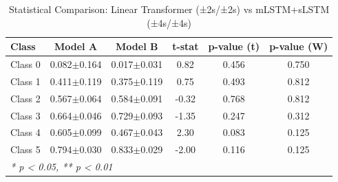 \begin{table}[htbp]
\centering
\caption{Statistical Comparison: Linear Transformer (±2s/±2s) vs mLSTM+sLSTM (±4s/±4s)}
\label{tab:comparison_class_linear_transformer_±2s_±2s_vs_mlstmslstm_±4s_±4s}
\begin{tabular}{lccccc}
\toprule
\textbf{Class} & \textbf{Model A} & \textbf{Model B} & \textbf{t-stat} & \textbf{p-value (t)} & \textbf{p-value (W)} \\
\midrule
Class 0 & 0.082$\pm$0.164 & 0.017$\pm$0.031 & 0.82 & 0.456 & 0.750 \\
Class 1 & 0.411$\pm$0.119 & 0.375$\pm$0.119 & 0.75 & 0.493 & 0.812 \\
Class 2 & 0.567$\pm$0.064 & 0.584$\pm$0.091 & -0.32 & 0.768 & 0.812 \\
Class 3 & 0.664$\pm$0.046 & 0.729$\pm$0.093 & -1.35 & 0.247 & 0.312 \\
Class 4 & 0.605$\pm$0.099 & 0.467$\pm$0.043 & 2.30 & 0.083 & 0.125 \\
Class 5 & 0.794$\pm$0.030 & 0.833$\pm$0.029 & -2.00 & 0.116 & 0.125 \\
\bottomrule
\multicolumn{6}{l}{\textit{* p < 0.05, ** p < 0.01}} \\
\end{tabular}
\end{table}